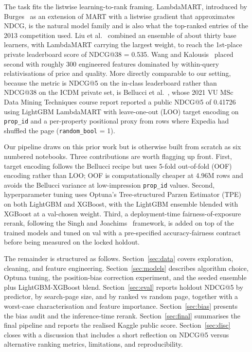 \documentclass[runningheads]{llncs}
\begin{document}
The task fits the listwise learning-to-rank framing. LambdaMART, introduced by Burges~\cite{burges2010ranknet} as an extension of MART with a listwise gradient that approximates NDCG, is the natural model family and is also what the top-ranked entries of the 2013 competition used. Liu et al.~\cite{liu2013expedia} combined an ensemble of about thirty base learners, with LambdaMART carrying the largest weight, to reach the 1st-place private leaderboard score of NDCG@38 = 0.535. Wang and Kalousis~\cite{wang2014expedia} placed second with roughly 300 engineered features dominated by within-query relativisations of price and quality. More directly comparable to our setting, because the metric is NDCG@5 on the in-class leaderboard rather than NDCG@38 on the ICDM private set, is Bellucci et al.~\cite{bellucci2021dmt}, whose 2021 VU MSc Data Mining Techniques course report reported a public NDCG@5 of 0.41726 using LightGBM LambdaMART with leave-one-out (LOO) target encoding on \texttt{prop\_id} and a per-property positional proxy from rows where Expedia had shuffled the page (\texttt{random\_bool} = 1).

Our pipeline draws on this prior work but is otherwise built from scratch as six numbered notebooks. Three contributions are worth flagging up front. First, target encoding follows the Bellucci recipe but uses 5-fold out-of-fold (OOF) encoding rather than LOO; OOF is computationally cheaper at 4.96M rows and avoids the Bellucci variance at low-impression \texttt{prop\_id} values. Second, hyperparameter tuning uses Optuna's Tree-structured Parzen Estimator (TPE)~\cite{bergstra2011tpe,akiba2019optuna} on both LightGBM and XGBoost, with the LightGBM ensemble blended with XGBoost at a val-chosen weight. Third, a deployment-time fairness-of-exposure rerank, following the Singh and Joachims~\cite{singh2018fairness} framework, is added on top of the trained models and tuned on val with a pre-specified accuracy-fairness contract before being measured on the locked holdout.

The remainder is structured as follows. Section~\ref{sec:data} covers exploration, cleaning, and feature engineering. Section~\ref{sec:models} describes algorithm choice, Optuna tuning, the position-bias correction experiment, and the seeded ensemble plus LightGBM-XGBoost blend. Section~\ref{sec:eval} reports holdout NDCG@5 by predictor, by search-page size, and by ranked vs random page, together with a worst-case characterisation and feature importance. Section~\ref{sec:bias} presents the bias audit and the inference-time rerank. Section~\ref{sec:final} summarises the final pipeline and reports the realised Kaggle public score. Section~\ref{sec:disc} closes with a discussion that includes a short reflection on NDCG@5 versus alternative ranking metrics, limitations, and reproducibility.
\end{document}
